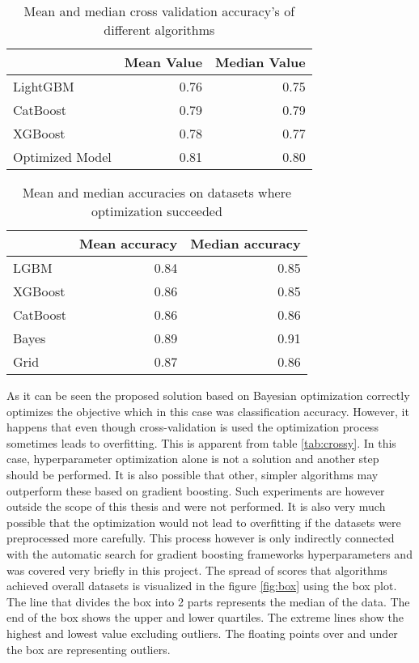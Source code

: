 \documentclass[a4paper,twoside,12pt]{book}
\begin{document}
\begin{table}[!htb]
\centering
\begin{tabular}{lrr}
\toprule
{} &  Mean Value &  Median Value \\
\midrule
LightGBM      &        0.76 &          0.75 \\
CatBoost       &        0.79 &          0.79 \\
XGBoost     &        0.78 &          0.77 \\
Optimized Model &        0.81 &          0.80 \\
\bottomrule
\end{tabular}

\caption{Mean and median cross validation accuracy's of different algorithms}
\label{tab:mean_median_cross}
\end{table}

\begin{table}[!htb]
\centering
\begin{tabular}{lrr}
\toprule
{} &  Mean accuracy &  Median accuracy \\
\midrule
LGBM     &        0.84 &          0.85 \\
XGBoost  &        0.86 &          0.85 \\
CatBoost &        0.86 &          0.86 \\
Bayes    &        0.89 &          0.91 \\
Grid     &        0.87 &          0.86 \\
\bottomrule
\end{tabular}


\caption{Mean and median accuracies on datasets where optimization succeeded}
\label{tab:lepsze}
\end{table}



As it can be seen the proposed solution based on Bayesian optimization correctly optimizes the objective which in this case was classification accuracy. However, it happens that even though cross-validation is used the optimization process sometimes leads to overfitting. This is apparent from table \ref{tab:crossy}.
In this case, hyperparameter optimization alone is not a solution and another step should be performed. It is also possible that other, simpler algorithms may outperform these based on gradient boosting. Such experiments are however outside the scope of this thesis and were not performed.
It is also very much possible that the optimization would not lead to overfitting if the datasets were preprocessed more carefully. This process however is only indirectly connected with the automatic search for gradient boosting frameworks hyperparameters and was covered very briefly in this project. 
The spread of scores that algorithms achieved overall datasets is visualized in the figure \ref{fig:box} using the box plot. The line that divides the box into 2 parts represents the median of the data. The end of the box shows the upper and lower quartiles. The extreme lines show the highest and lowest value excluding outliers. The floating points over and under the box are representing outliers.
\end{document}
